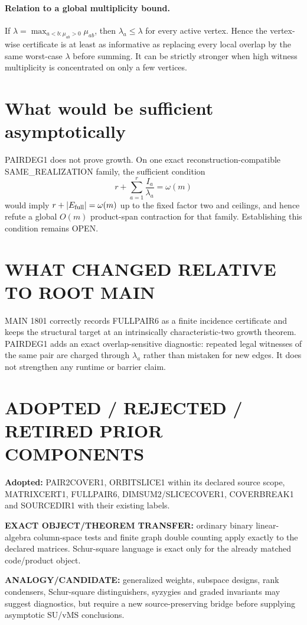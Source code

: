 \documentclass[11pt]{article}
\begin{document}
\paragraph{Relation to a global multiplicity bound.}
If \(\lambda=\max_{a<b:\mu_{ab}>0}\mu_{ab}\), then \(\lambda_a\le\lambda\) for every active vertex. Hence the vertex-wise certificate is at least as informative as replacing every local overlap by the same worst-case \(\lambda\) before summing. It can be strictly stronger when high witness multiplicity is concentrated on only a few vertices.

\section*{What would be sufficient asymptotically}
PAIRDEG1 does not prove growth. On one exact reconstruction-compatible SAME\_REALIZATION family, the sufficient condition
\[
r+\sum_{a=1}^r\frac{I_a}{\lambda_a}=\omega(m)
\]
would imply \(r+|E_{\rm full}|=\omega(m)\) up to the fixed factor two and ceilings, and hence refute a global \(O(m)\) product-span contraction for that family. Establishing this condition remains OPEN.

\section*{WHAT CHANGED RELATIVE TO ROOT MAIN}
MAIN 1801 correctly records FULLPAIR6 as a finite incidence certificate and keeps the structural target at an intrinsically characteristic-two growth theorem. PAIRDEG1 adds an exact overlap-sensitive diagnostic: repeated legal witnesses of the same pair are charged through \(\lambda_a\) rather than mistaken for new edges. It does not strengthen any runtime or barrier claim.

\section*{ADOPTED / REJECTED / RETIRED PRIOR COMPONENTS}
\textbf{Adopted:} PAIR2COVER1, ORBITSLICE1 within its declared source scope, MATRIXCERT1, FULLPAIR6, DIMSUM2/SLICECOVER1, COVERBREAK1 and SOURCEDIR1 with their existing labels.

\textbf{EXACT OBJECT/THEOREM TRANSFER:} ordinary binary linear-algebra column-space tests and finite graph double counting apply exactly to the declared matrices. Schur-square language is exact only for the already matched code/product object.

\textbf{ANALOGY/CANDIDATE:} generalized weights, subspace designs, rank condensers, Schur-square distinguishers, syzygies and graded invariants may suggest diagnostics, but require a new source-preserving bridge before supplying asymptotic SU/vMS conclusions.
\end{document}
